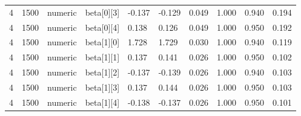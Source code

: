 \begin{table}
\begin{tabular}{llllllllll}
4 & 1500 & numeric & beta[0][3] & -0.137 & -0.129 & 0.049 & 1.000 & 0.940 & 0.194 \\
4 & 1500 & numeric & beta[0][4] & 0.138 & 0.126 & 0.049 & 1.000 & 0.950 & 0.192 \\
4 & 1500 & numeric & beta[1][0] & 1.728 & 1.729 & 0.030 & 1.000 & 0.940 & 0.119 \\
4 & 1500 & numeric & beta[1][1] & 0.137 & 0.141 & 0.026 & 1.000 & 0.950 & 0.102 \\
4 & 1500 & numeric & beta[1][2] & -0.137 & -0.139 & 0.026 & 1.000 & 0.940 & 0.103 \\
4 & 1500 & numeric & beta[1][3] & 0.137 & 0.144 & 0.026 & 1.000 & 0.950 & 0.103 \\
4 & 1500 & numeric & beta[1][4] & -0.138 & -0.137 & 0.026 & 1.000 & 0.950 & 0.101 \\
\bottomrule
\end{tabular}
\end{table}
